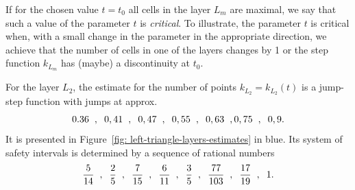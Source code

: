 If for the chosen value $t = t_{0}$ all cells in the layer $L_ {m}$ are maximal, we say that such a value of the parameter $t$ is \textit{critical}. To illustrate, the parameter $t$ is critical when, with a small change in the parameter in the appropriate direction, we achieve that the number of cells in one of the layers changes by 1 or the step function $k_{L_{m}}$ has (maybe) a discontinuity at $t_{0}$.

For the layer $L_{2}$, the estimate for the number of points $k_{L_{2}} = k_{L_{2}}(t)$ is a jump-step function with jumps at approx.
$$
0.36\text{\hspace{0.2cm}},\text{\hspace{0.2cm}} 0,41\text{\hspace{0.2cm}} ,\text{\hspace{0.2cm}} 0,47\text{\hspace{0.2cm}}  ,\text{\hspace{0.2cm}} 0,55\text{\hspace{0.2cm}} ,\text{\hspace{0.2cm}} 0,63\text{\hspace{0.2cm}} , 0,75\text{\hspace{0.2cm}} ,\text{\hspace{0.2cm}} 0,9.
$$
It is presented in Figure~\ref{fig: left-triangle-layers-estimates} in blue. Its system of safety intervals is determined by a sequence of rational numbers
$$
\frac{5}{14}\text{\hspace{0.2cm}} ,\text{\hspace{0.2cm}} \frac{2}{5}\text{\hspace{0.2cm}} ,\text{\hspace{0.2cm}} \frac{7}{15}\text{\hspace{0.2cm}} ,\text{\hspace{0.2cm}} \frac{6}{11}\text{\hspace{0.2cm}} ,\text{\hspace{0.2cm}} \frac{3}{5}\text{\hspace{0.2cm}} ,\text{\hspace{0.2cm}} \frac{77}{103}\text{\hspace{0.2cm}} ,\text{\hspace{0.2cm}} \frac{17}{19}\text{\hspace{0.2cm}} ,\text{\hspace{0.2cm}} 1.
$$

